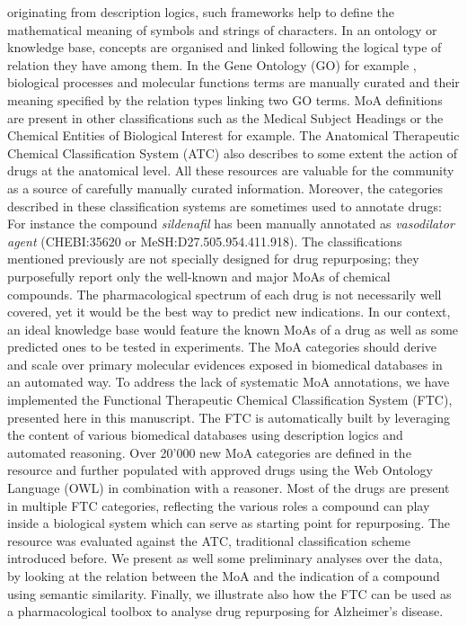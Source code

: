 \documentclass{bioinfo}
\begin{document}
originating from description logics, such frameworks help to define the mathematical meaning of symbols and strings of characters. 
In an ontology or knowledge base, concepts are organised and linked following the logical type of relation they have among them. 
In the Gene Ontology (GO) for example \citep{Ashburner2000}, biological processes and molecular functions terms are manually curated  
and their meaning specified by the relation types linking two GO terms.
MoA definitions are present in other classifications such as the Medical Subject Headings \citep{Nelson2004} or the Chemical Entities of 
Biological Interest \citep{Hastings2012} for example. The Anatomical Therapeutic 
Chemical Classification System (ATC) \citep{world2000anatomical} also describes to some 
extent the action of drugs at the anatomical level. All these resources are valuable for the community as a source of carefully 
manually curated information. Moreover, the categories described in these classification systems are sometimes used to annotate 
drugs: For instance the compound \emph{sildenafil} has been manually annotated as \emph{vasodilator agent} (CHEBI:35620 or MeSH:D27.505.954.411.918).
The classifications mentioned previously are not specially designed for drug repurposing; they purposefully report only the 
well-known and major MoAs of chemical compounds. The pharmacological spectrum of each drug is not necessarily well covered, yet 
it would be the best way to predict new indications. In our context, an ideal knowledge base would feature the known MoAs of a 
drug as well as some predicted ones to be tested in experiments. The MoA categories should derive and scale over primary molecular 
evidences exposed in biomedical databases in an automated way.
To address the lack of systematic MoA annotations, we have implemented the Functional Therapeutic Chemical 
Classification System (FTC), presented here in this manuscript. The FTC is automatically built by leveraging the content 
of various biomedical databases using description logics and automated reasoning. Over 20'000 new MoA categories are defined 
in the resource and further populated with approved drugs using the Web Ontology Language (OWL) in combination with a reasoner. 
Most of the drugs are present in multiple FTC categories, reflecting the various roles a compound can play inside a biological system which 
can serve as starting point for repurposing. 
The resource was evaluated against the ATC, traditional classification scheme introduced before. We present as well some preliminary 
analyses over the data, by looking at the relation between the MoA and the indication of a compound using semantic similarity. 
Finally, we illustrate also how the FTC can be used as a pharmacological toolbox to analyse drug repurposing for Alzheimer’s disease.
\end{document}
